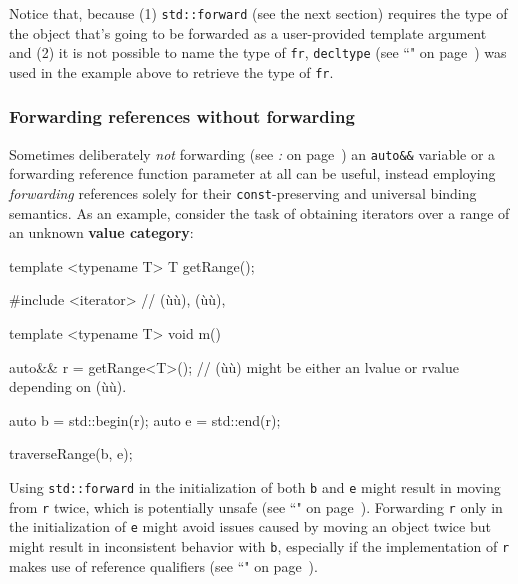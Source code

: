 \noindent Notice that, because (1) \texttt{std::forward} (see the next section) requires the
type of the object that's going to be forwarded as a user-provided
template argument and (2) it is not possible to name the type of
\texttt{fr}, \texttt{decltype} (see ``" on page~\pageref{decltype}) was used in the example above
to retrieve the type of \texttt{fr}.

\subsubsection[Forwarding references without forwarding]{Forwarding references without forwarding}\label{forwarding-references-without-forwarding}

Sometimes deliberately \emph{not} forwarding (see \textit{: } on page~\pageref{the-std::forward-utility}) an \texttt{auto\&\&} variable or
a forwarding reference function parameter at all can be useful, instead employing
\emph{forwarding} references solely for their \texttt{const}-preserving
and universal binding semantics. As an example, consider the task of
obtaining iterators over a range of an unknown \textbf{value category}:

\begin{emcppshiddenlisting}[emcppsbatch=e6]
template <typename T>
T getRange();
\end{emcppshiddenlisting}
\begin{emcppslisting}[emcppsbatch=e6]
#include <iterator>  // (ù{}ù), (ù{}ù),

template <typename T>
void m()
{
    auto&& r = getRange<T>();
        // (ù{}ù) might be either an lvalue or rvalue depending on (ù{}ù).

    auto b = std::begin(r);
    auto e = std::end(r);

    traverseRange(b, e);
}
\end{emcppslisting}

\noindent Using \texttt{std::forward} in the initialization of both \texttt{b} and
\texttt{e} might result in moving from \texttt{r} twice, which is
potentially unsafe (see ``" on page~\pageref{Rvalue-References}). Forwarding
\texttt{r} only in the initialization of \texttt{e} might avoid issues
caused by moving an object twice but might result in inconsistent
behavior with \texttt{b}, especially if the implementation of \texttt{r}
makes use of reference qualifiers (see ``" on page~\pageref{refqualifiers}).

